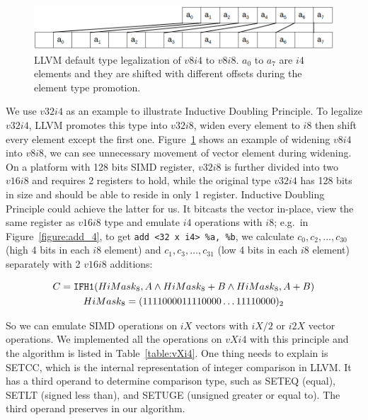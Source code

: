 \begin{figure}[ht!]
\centering
\includegraphics[width=130mm]{draw/v8i4_v8i8.png}
\caption[LLVM default type legalization of $v8i4$ to $v8i8$.]{LLVM default type legalization of $v8i4$ to $v8i8$. $a_0$ to $a_7$ are $i4$ elements and they are shifted with different offsets during the element type promotion.}
\label{figure:v8i4_v8i8}
\end{figure}

We use $v32i4$ as an example to illustrate Inductive Doubling Principle. To legalize $v32i4$, LLVM promotes this type into $v32i8$, widen every element to $i8$ then shift every element except the first one. Figure~\ref{figure:v8i4_v8i8} shows an example of widening $v8i4$ into $v8i8$, we can see unnecessary movement of vector element during widening. On a platform with 128 bits SIMD register, $v32i8$ is further divided into two $v16i8$ and requires 2 registers to hold, while the original type $v32i4$ has 128 bits in size and should be able to reside in only 1 register. Inductive Doubling Principle could achieve the latter for us. It bitcasts the vector in-place, view the same register as $v16i8$ type and emulate $i4$ operations with $i8$; e.g.\ in Figure~\ref{figure:add_4}, to get \verb|add <32 x i4> %a, %b|, we calculate $c_0, c_2, \ldots, c_{30}$ (high 4 bits in each $i8$ element) and $c_1, c_3, \ldots, c_{31}$ (low 4 bits in each $i8$ element) separately with 2 $v16i8$ additions:

\begin{gather}
C = \text{\tt IFH1}(HiMask_8, A \land HiMask_8 + B \land HiMask_8, A + B) \\
HiMask_8 = (1111000011110000 \ldots 11110000)_2
\end{gather}

So we can emulate SIMD operations on $iX$ vectors with $iX/2$ or $i2X$ vector operations. We implemented all the operations on $vXi4$ with this principle and the algorithm is listed in Table~\ref{table:vXi4}. One thing needs to explain is SETCC, which is the internal representation of integer comparison in LLVM\@. It has a third operand to determine comparison type, such as SETEQ (equal), SETLT (signed less than), and SETUGE (unsigned greater or equal to). The third operand preserves in our algorithm.

